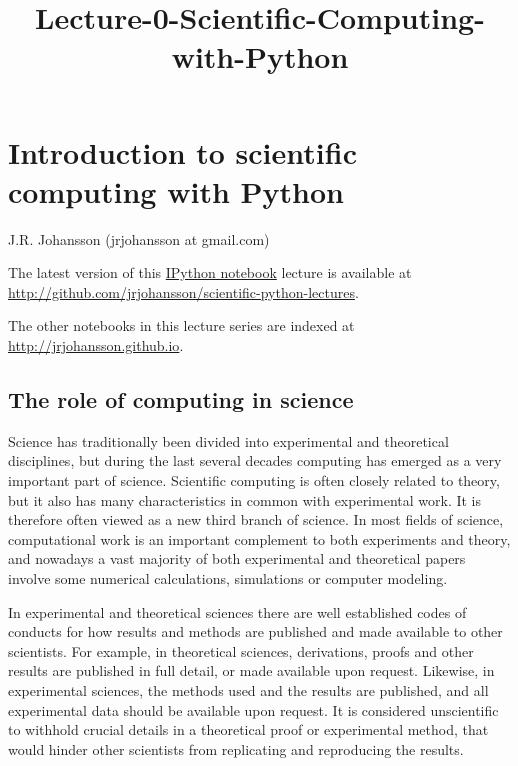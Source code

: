 \documentclass[11pt]{article}
\title{Lecture-0-Scientific-Computing-with-Python}
\begin{document}
    
    \maketitle
    
    

    
    \hypertarget{introduction-to-scientific-computing-with-python}{%
\section{Introduction to scientific computing with
Python}\label{introduction-to-scientific-computing-with-python}}

    J.R. Johansson (jrjohansson at gmail.com)

The latest version of this
\href{http://ipython.org/notebook.html}{IPython notebook} lecture is
available at
\url{http://github.com/jrjohansson/scientific-python-lectures}.

The other notebooks in this lecture series are indexed at
\url{http://jrjohansson.github.io}.

    \hypertarget{the-role-of-computing-in-science}{%
\subsection{The role of computing in
science}\label{the-role-of-computing-in-science}}

    Science has traditionally been divided into experimental and theoretical
disciplines, but during the last several decades computing has emerged
as a very important part of science. Scientific computing is often
closely related to theory, but it also has many characteristics in
common with experimental work. It is therefore often viewed as a new
third branch of science. In most fields of science, computational work
is an important complement to both experiments and theory, and nowadays
a vast majority of both experimental and theoretical papers involve some
numerical calculations, simulations or computer modeling.

In experimental and theoretical sciences there are well established
codes of conducts for how results and methods are published and made
available to other scientists. For example, in theoretical sciences,
derivations, proofs and other results are published in full detail, or
made available upon request. Likewise, in experimental sciences, the
methods used and the results are published, and all experimental data
should be available upon request. It is considered unscientific to
withhold crucial details in a theoretical proof or experimental method,
that would hinder other scientists from replicating and reproducing the
results.
\end{document}
